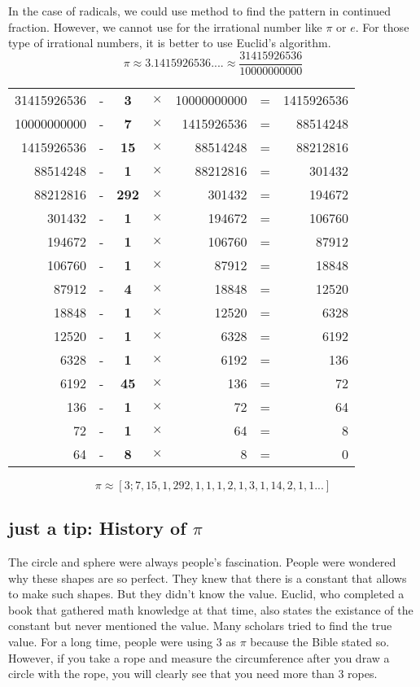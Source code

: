 \documentclass{jreport}
\begin{document}
\pagebreak

In the case of radicals, we could use method to find the pattern in continued fraction. However, we cannot use for the irrational number like $\pi$ or $e$. For those type of irrational numbers, it is better to use Euclid's algorithm. 
\[\pi \approx 3.1415926536.... \approx \frac{31415926536}{10000000000}\]
\begin{table}[htbp]
\begin{center}
\begin{tabular}{|rc|c|crcr|}
\hline
31415926536 & - & \textbf{3} & $\times$ & 10000000000 & = & 1415926536\\
10000000000 & - & \textbf{7} & $\times$ & 1415926536 & = & 88514248\\
1415926536 & - & \textbf{15} & $\times$ & 88514248 & = & 88212816\\
88514248 & - & \textbf{1} & $\times$ & 88212816 & = & 301432\\
88212816 & - & \textbf{292} & $\times$ & 301432 & = & 194672\\
301432 & - & \textbf{1} & $\times$ & 194672 & = & 106760\\
194672 & - & \textbf{1} & $\times$ & 106760 & = & 87912\\
106760 & - & \textbf{1} & $\times$ & 87912 & = & 18848\\
\hline
87912 & - & \textbf{4} & $\times$ & 18848 & = & 12520\\
18848 & - & \textbf{1} & $\times$ & 12520 & = & 6328\\
12520 & - & \textbf{1} & $\times$ & 6328 & = & 6192\\
6328 & - & \textbf{1} & $\times$ & 6192 & = & 136\\
6192 & - & \textbf{45} & $\times$ & 136 & = & 72\\
136 & - & \textbf{1} & $\times$ & 72 & = & 64\\
72 & - & \textbf{1} & $\times$ & 64 & = & 8\\
64 & - & \textbf{8} & $\times$ & 8 & = & 0\\
\hline
\end{tabular}
\end{center}
\end{table}
\[\pi \approx [3;7,15,1,292,1,1,1,2,1,3,1,14,2,1,1...]\]

\pagebreak

\subsection*{just a tip: History of $\pi$}
The circle and sphere were always people's fascination. People were wondered why these shapes are so perfect. They knew that there is a constant that allows to make such shapes. But they didn't know the value. Euclid, who completed a book that gathered math knowledge at that time, also states the existance of the constant but never mentioned the value. Many scholars tried to find the true value. For a long time, people were using 3 as $\pi$ because the Bible stated so. However, if you take a rope and measure the circumference after you draw a circle with the rope, you will clearly see that you need more than 3 ropes.
\end{document}
